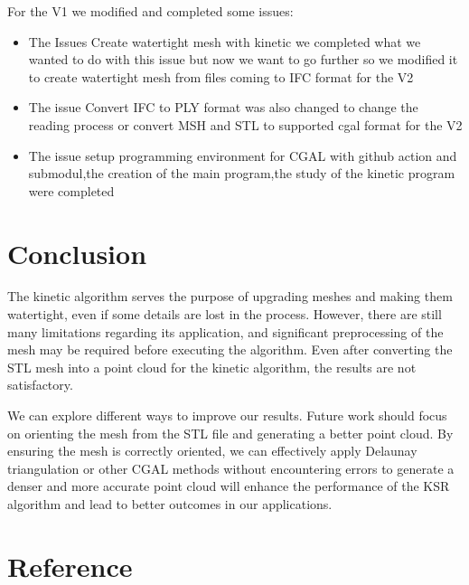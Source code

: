 \documentclass{article}
\begin{document}
For the V1 we modified and completed some issues:
\begin{itemize}
  \item The Issues Create watertight mesh with kinetic we completed what we wanted to do with this issue but now we want to go further so we modified it 
  to create watertight mesh from files coming to IFC format for the V2
  \item The issue Convert IFC to PLY format was also changed to change the reading process or convert MSH and STL to supported cgal format for the V2
  \item The issue setup programming environment for CGAL with github action and submodul,the creation of the main program,the study of the kinetic program were completed 
\end{itemize}



\section{Conclusion}
The kinetic algorithm serves the purpose of upgrading meshes and making them watertight, even if some details are lost in the process. However, 
there are still many limitations regarding its application, and significant preprocessing of the mesh may be required before executing the algorithm. 
Even after converting the STL mesh into a point cloud for the kinetic algorithm, the results are not satisfactory.

We can explore different ways to improve our results. Future work should focus on orienting the mesh from the STL file and generating a better point cloud. 
By ensuring the mesh is correctly oriented, we can effectively apply Delaunay triangulation or other CGAL methods without encountering errors to  generate a denser 
and more accurate point cloud will enhance the performance of the KSR algorithm and lead to better outcomes in our applications.

\nocite{*}
\section{Reference}


\end{document}
